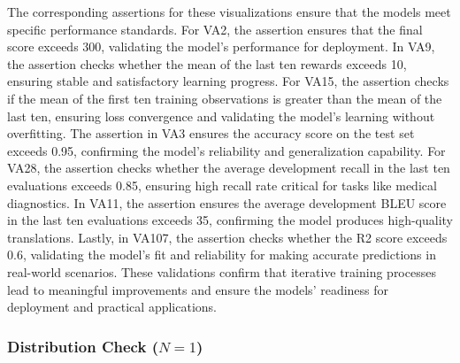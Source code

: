 The corresponding assertions for these visualizations ensure that the models meet specific performance standards. For VA2, the assertion ensures that the final score exceeds 300, validating the model's performance for deployment. In VA9, the assertion checks whether the mean of the last ten rewards exceeds 10, ensuring stable and satisfactory learning progress. For VA15, the assertion checks if the mean of the first ten training observations is greater than the mean of the last ten, ensuring loss convergence and validating the model's learning without overfitting. The assertion in VA3 ensures the accuracy score on the test set exceeds 0.95, confirming the model's reliability and generalization capability. For VA28, the assertion checks whether the average development recall in the last ten evaluations exceeds 0.85, ensuring high recall rate critical for tasks like medical diagnostics. In VA11, the assertion ensures the average development BLEU score in the last ten evaluations exceeds 35, confirming the model produces high-quality translations. Lastly, in VA107, the assertion checks whether the R2 score exceeds 0.6, validating the model's fit and reliability for making accurate predictions in real-world scenarios. These validations confirm that iterative training processes lead to meaningful improvements and ensure the models' readiness for deployment and practical applications.


\subsubsection{Distribution Check ($N = 1$)}

